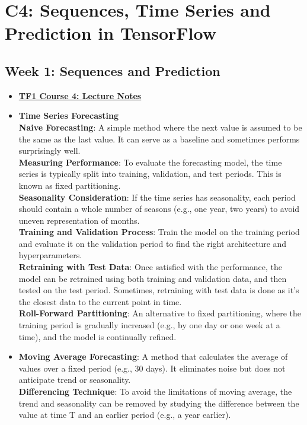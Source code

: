 \documentclass[20pt]{article}
\newcommand{\speciallink}[2]{\textbf{\textcolor{red}{\href{#1}{#2}}}}
\begin{document}
	\section{C4: Sequences, Time Series and Prediction in TensorFlow}
	\subsection{Week 1: Sequences and Prediction}
	\begin{itemize}
		\item \speciallink{https://community.deeplearning.ai/t/tf1-course-4-lecture-notes/121711}{TF1 Course 4: Lecture Notes}
		\item \textbf{Time Series Forecasting}\\
		\textbf{Naive Forecasting}: A simple method where the next value is assumed to be the same as the last value. It can serve as a baseline and sometimes performs surprisingly well.\\
		\textbf{Measuring Performance}: To evaluate the forecasting model, the time series is typically split into training, validation, and test periods. This is known as fixed partitioning.\\
		\textbf{Seasonality Consideration}: If the time series has seasonality, each period should contain a whole number of seasons (e.g., one year, two years) to avoid uneven representation of months.\\
		\textbf{Training and Validation Process}: Train the model on the training period and evaluate it on the validation period to find the right architecture and hyperparameters.\\
		\textbf{Retraining with Test Data}: Once satisfied with the performance, the model can be retrained using both training and validation data, and then tested on the test period. Sometimes, retraining with test data is done as it's the closest data to the current point in time.\\
		\textbf{Roll-Forward Partitioning}: An alternative to fixed partitioning, where the training period is gradually increased (e.g., by one day or one week at a time), and the model is continually refined.\\
		\item \textbf{Moving Average Forecasting}: A method that calculates the average of values over a fixed period (e.g., 30 days). It eliminates noise but does not anticipate trend or seasonality.\\
		\textbf{Differencing Technique}: To avoid the limitations of moving average, the trend and seasonality can be removed by studying the difference between the value at time T and an earlier period (e.g., a year earlier).\\

\end{itemize}
\end{document}
